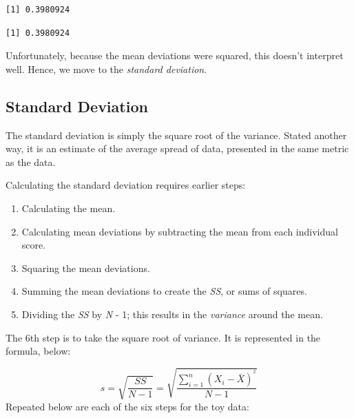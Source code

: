 \documentclass[
  11pt,
]{book}
\newenvironment{Shaded}{\begin{snugshade}}{\end{snugshade}}
\newcommand{\FunctionTok}[1]{\textcolor[rgb]{0.00,0.00,0.00}{#1}}
\newcommand{\NormalTok}[1]{#1}
\newcommand{\SpecialCharTok}[1]{\textcolor[rgb]{0.00,0.00,0.00}{#1}}
\providecommand{\tightlist}{%
  \setlength{\itemsep}{0pt}\setlength{\parskip}{0pt}}
\begin{document}
\begin{verbatim}
[1] 0.3980924
\end{verbatim}

\begin{Shaded}
\end{Shaded}

\begin{verbatim}
[1] 0.3980924
\end{verbatim}

Unfortunately, because the mean deviations were squared, this doesn't interpret well. Hence, we move to the \emph{standard deviation}.

\hypertarget{standard-deviation}{%
\subsection{Standard Deviation}\label{standard-deviation}}

The standard deviation is simply the square root of the variance. Stated another way, it is an estimate of the average spread of data, presented in the same metric as the data.

Calculating the standard deviation requires earlier steps:

\begin{enumerate}
\def\labelenumi{\arabic{enumi}.}
\tightlist
\item
  Calculating the mean.
\item
  Calculating mean deviations by subtracting the mean from each individual score.
\item
  Squaring the mean deviations.
\item
  Summing the mean deviations to create the \emph{SS}, or sums of squares.
\item
  Dividing the \emph{SS} by \emph{N} - 1; this results in the \emph{variance} around the mean.
\end{enumerate}

The 6th step is to take the square root of variance. It is represented in the formula, below:

\[s=\sqrt{\frac{SS}{N-1}}=\sqrt{\frac{\sum_{i=1}^{n}(X_{i} - \bar{X})^{^{2}}}{N-1}}\]
Repeated below are each of the six steps for the toy data:
\end{document}
